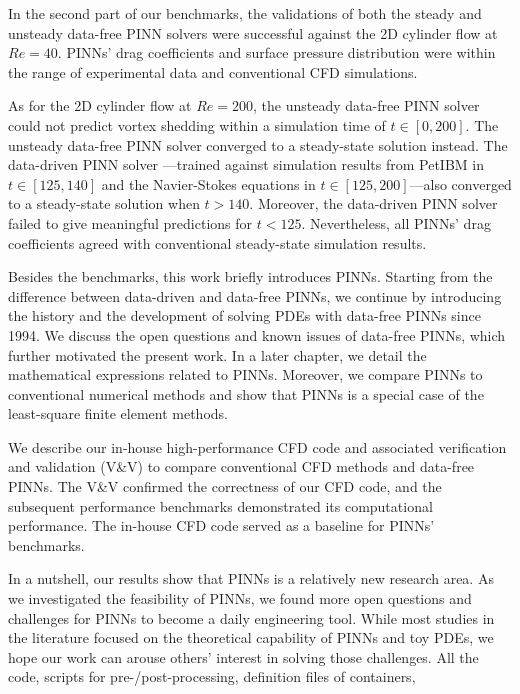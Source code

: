 {In the second part of our benchmarks, the validations of both the steady and unsteady data-free PINN solvers were successful against the 2D cylinder flow at $Re=40$.
PINNs' drag coefficients and surface pressure distribution were within the range of experimental data and conventional CFD simulations.

As for the 2D cylinder flow at $Re=200$, the unsteady data-free PINN solver could not predict vortex shedding within a simulation time of $t\in[0, 200]$.
The unsteady data-free PINN solver converged to a steady-state solution instead.
The data-driven PINN solver ---trained against simulation results from PetIBM in $t \in [125, 140]$ and the Navier-Stokes equations in $t\in[125, 200]$---also converged to a steady-state solution when $t > 140$.
Moreover, the data-driven PINN solver failed to give meaningful predictions for $t<125$.
Nevertheless, all PINNs' drag coefficients agreed with conventional steady-state simulation results.

Besides the benchmarks, this work briefly introduces PINNs.
Starting from the difference between data-driven and data-free PINNs, we continue by introducing the history and the development of solving PDEs with data-free PINNs since 1994.
We discuss the open questions and known issues of data-free PINNs, which further motivated the present work.
In a later chapter, we detail the mathematical expressions related to PINNs.
Moreover, we compare PINNs to conventional numerical methods and show that PINNs is a special case of the least-square finite element methods.

We describe our in-house high-performance CFD code and associated verification and validation (V\&V) to compare conventional CFD methods and data-free PINNs.
The V\&V confirmed the correctness of our CFD code, and the subsequent performance benchmarks demonstrated its computational performance.
The in-house CFD code served as a baseline for PINNs' benchmarks.

In a nutshell, our results show that PINNs is a relatively new research area.
As we investigated the feasibility of PINNs, we found more open questions and challenges for PINNs to become a daily engineering tool.
While most studies in the literature focused on the theoretical capability of PINNs and toy PDEs, we hope our work can arouse others' interest in solving those challenges.
All the code, scripts for pre-/post-processing, definition files of containers, 
}
